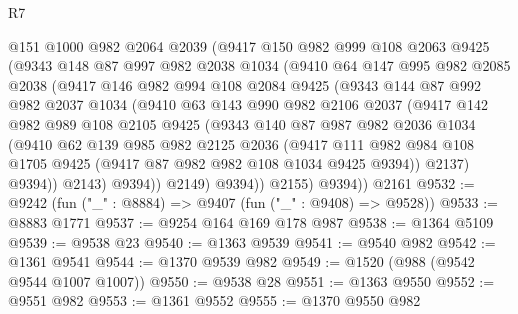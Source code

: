 \begin{lexlean}{R7}
\begin{coremodule}
          @151
          @1000
          @982
          @2064
          @2039
          (@9417
            @150
            @982
            @999
            @108
            @2063
            @9425
            (@9343
              @148
              @87
              @997
              @982
              @2038
              @1034
              (@9410
                @64
                @147
                @995
                @982
                @2085
                @2038
                (@9417
                  @146
                  @982
                  @994
                  @108
                  @2084
                  @9425
                  (@9343
                    @144
                    @87
                    @992
                    @982
                    @2037
                    @1034
                    (@9410
                      @63
                      @143
                      @990
                      @982
                      @2106
                      @2037
                      (@9417
                        @142
                        @982
                        @989
                        @108
                        @2105
                        @9425
                        (@9343
                          @140
                          @87
                          @987
                          @982
                          @2036
                          @1034
                          (@9410
                            @62
                            @139
                            @985
                            @982
                            @2125
                            @2036
                            (@9417
                              @111
                              @982
                              @984
                              @108
                              @1705
                              @9425
                              (@9417 @87 @982 @982 @108 @1034 @9425 @9394))
                            @2137)
                          @9394))
                      @2143)
                    @9394))
                @2149)
              @9394))
          @2155)
        @9394))
    @2161
@9532 := @9242 (fun ("_" : @8884) => @9407 (fun ("_" : @9408) => @9528))
@9533 := @8883 @1771
@9537 := @9254 @164 @169 @178 @987
@9538 := @1364 @5109
@9539 := @9538 @23
@9540 := @1363 @9539
@9541 := @9540 @982
@9542 := @1361 @9541
@9544 := @1370 @9539 @982
@9549 := @1520 (@988 (@9542 @9544 @1007 @1007))
@9550 := @9538 @28
@9551 := @1363 @9550
@9552 := @9551 @982
@9553 := @1361 @9552
@9555 := @1370 @9550 @982

\end{coremodule}
\end{lexlean}
